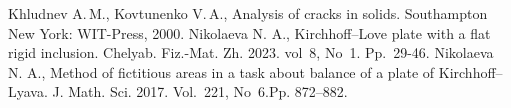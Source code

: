 



\begin{thebibliography}{99}
Khludnev A.\,M., Kovtunenko V.\,A., Analysis of cracks in solids.  Southampton New York: WIT-Press, 2000.
Nikolaeva N. A., Kirchhoff--Love plate with a flat rigid inclusion. Chelyab. Fiz.-Mat. Zh. 2023. vol~8, No~1. Pp.~29-46.
Nikolaeva N. A., Method of fictitious areas in a task about balance of a plate of Kirchhoff–Lyava. J. Math. Sci. 2017. Vol.~221, No~6.Pp. 872–882.

\end{thebibliography}






%


